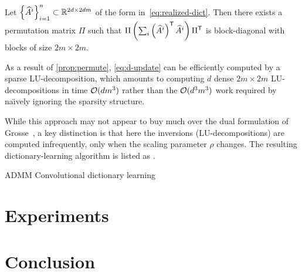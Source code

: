 \documentclass{article} %
\begin{document}
\begin{proposition}
Let ${\left\{\widehat{A}^i\right\}}_{i=1}^n \subset \mathbb{R}^{2d \times 2dm}$ of the form 
in~\eqref{eq:realized-dict}.  Then there exists a permutation matrix $\Pi$ such that 
$\Pi\left(\sum_i \left(\widehat{A}^i\right)^\mathsf{T} \widehat{A}^i \right)\Pi^\mathsf{T}$ 
is block-diagonal with blocks of size $2m\times 2m$.\label{prop:permute}
\end{proposition}

As a result of \cref{prop:permute}, \eqref{eq:d-update} can be efficiently computed by
a sparse LU-decomposition, which amounts to computing $d$ dense $2m\times2m$
LU-decompositions in time $\mathcal{O}(dm^3)$ rather than the $\mathcal{O}(d^3m^3)$ work required by 
na\"{\i}vely ignoring the sparsity structure.

While this approach may not appear to buy much over the dual formulation of Grosse~\etal, 
a key distinction is that here the inversions (LU-decompositions) are computed
infrequently, only when the scaling parameter $\rho$ changes.  The resulting
dictionary-learning algorithm is listed as .

\begin{algorithm}[t]
\caption{ADMM Convolutional dictionary learning}
\label{alg:dict}
\begin{algorithmic}[1]

\REPEAT{}



\end{algorithmic}
\end{algorithm}


\section{Experiments}

\section{Conclusion}



\end{document}
